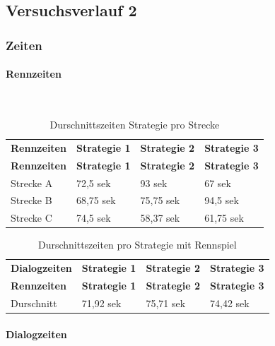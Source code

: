 \documentclass[12pt,a4paper]{scrartcl}
\begin{document}
\subsection{Versuchsverlauf 2}
\subsubsection{Zeiten}
\paragraph{Rennzeiten}
~\\
\begin{longtable}{p{3cm}p{3cm}p{3cm}p{3cm} }
	\label{durchschnittsvorl}\\
	\caption[Durschnittszeiten Strategie pro Strecke]{Durschnittszeiten Strategie pro Strecke}\\
	\hline
	\textbf{Rennzeiten}&\textbf{Strategie 1}&\textbf{Strategie 2} &\textbf{Strategie 3}\\
	\hline
	\endfirsthead
	\hline
	\textbf{Rennzeiten}&\textbf{Strategie 1}&\textbf{Strategie 2} &\textbf{Strategie 3}\\
	\hline
	\endhead
Strecke A & 72,5 sek & 93 sek & 67 sek \\
Strecke B & 68,75 sek & 75,75 sek & 94,5 sek \\
Strecke C & 74,5 sek & 58,37 sek & 61,75 sek \\

\hline
\end{longtable}

\begin{longtable}{p{3cm}p{3cm}p{3cm}p{3cm} }
	\label{Dialogzeiten}\\
	\caption[Durschnittszeiten pro Strategie mit Rennspiel]{Durschnittszeiten pro Strategie mit Rennspiel}\\
	\hline
	\textbf{Dialogzeiten}&\textbf{Strategie 1}&\textbf{Strategie 2} &\textbf{Strategie 3}\\
	\hline
	\endfirsthead
	\hline
	\textbf{Rennzeiten}&\textbf{Strategie 1}&\textbf{Strategie 2} &\textbf{Strategie 3}\\
	\hline
	\endhead
Durschnitt & 71,92 sek &75,71 sek & 74,42 sek \\


\hline
\end{longtable}



\paragraph{Dialogzeiten}
~\\
\end{document}
